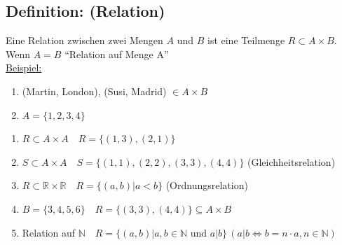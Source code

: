 \subsection{Definition: (Relation)}
Eine Relation zwischen zwei Mengen $A$ und $B$ ist eine Teilmenge $R \subset A \times B$. Wenn $A=B$ "`Relation auf Menge A"'\\
\underline{Beispiel:}\\
\begin{enumerate}[label=\alph*)]
	\item (Martin, London), (Susi, Madrid) $\in A\times B$
	\item $A=\{1,2,3,4\}$
\end{enumerate}
\begin{enumerate}
	\item $R \subset A \times A \quad R=\{(1,3),(2,1)\}$
	\item $S \subset A \times A \quad S=\{(1,1),(2,2),(3,3),(4,4)\}$ (Gleichheitsrelation)
	\item $R \subset \mathbb{R}\times\mathbb{R} \quad R=\{(a,b)|a<b\}$ 
		(Ordnungsrelation)
	\item $B=\{3,4,5,6\} \quad R=\{(3,3),(4,4)\} \subseteq A\times B$
	\item Relation auf $\mathbb{N} \quad R=\{(a,b)|a,b\in\mathbb{N}$ und $a|b\} \, (a|b 
		\Leftrightarrow b=n\cdot a, n \in \mathbb{N})$
\end{enumerate}
%
%
%
